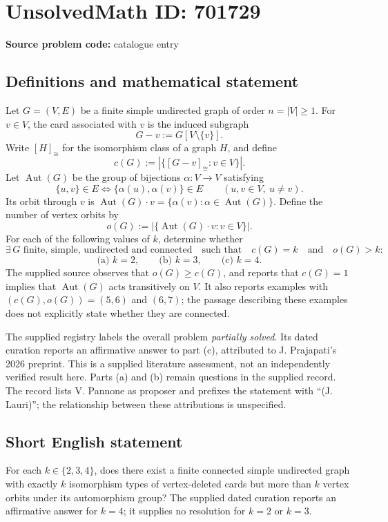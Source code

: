 \documentclass[11pt]{article}
\begin{document}
\section*{UnsolvedMath ID: 701729}
\textbf{Source problem code:} catalogue entry
\subsection{Definitions and mathematical statement}
Let \(G=(V,E)\) be a finite simple undirected graph of order \(n=|V|\geq 1\). For \(v\in V\), the card associated with \(v\) is the induced subgraph
\[
G-v:=G[V\setminus\{v\}].
\]
Write \([H]_{\cong}\) for the isomorphism class of a graph \(H\), and define
\[
c(G):=\left|\{[G-v]_{\cong}:v\in V\}\right|.
\]
Let \(\operatorname{Aut}(G)\) be the group of bijections \(\alpha:V\to V\) satisfying
\[
\{u,v\}\in E\iff\{\alpha(u),\alpha(v)\}\in E
\qquad(u,v\in V,
\ u\ne v).
\]
Its orbit through \(v\) is \(\operatorname{Aut}(G)\cdot v=\{\alpha(v):\alpha\in\operatorname{Aut}(G)\}\). Define the number of vertex orbits by
\[
o(G):=\left|\{\operatorname{Aut}(G)\cdot v:v\in V\}\right|.
\]
For each of the following values of \(k\), determine whether
\[
\exists\,G\text{ finite, simple, undirected and connected}
\quad\text{such that}\quad c(G)=k\quad\text{and}\quad o(G)>k:
\]
\[
\text{(a) }k=2,\qquad \text{(b) }k=3,\qquad \text{(c) }k=4.
\]
The supplied source observes that \(o(G)\geq c(G)\), and reports that \(c(G)=1\) implies that \(\operatorname{Aut}(G)\) acts transitively on \(V\). It also reports examples with \((c(G),o(G))=(5,6)\) and \((6,7)\); the passage describing these examples does not explicitly state whether they are connected.

The supplied registry labels the overall problem \emph{partially solved}. Its dated curation reports an affirmative answer to part (c), attributed to J. Prajapati's 2026 preprint. This is a supplied literature assessment, not an independently verified result here. Parts (a) and (b) remain questions in the supplied record. The record lists V. Pannone as proposer and prefixes the statement with ``(J. Lauri)''; the relationship between these attributions is unspecified.
\subsection{Short English statement}
For each \(k\in\{2,3,4\}\), does there exist a finite connected simple undirected graph with exactly \(k\) isomorphism types of vertex-deleted cards but more than \(k\) vertex orbits under its automorphism group? The supplied dated curation reports an affirmative answer for \(k=4\); it supplies no resolution for \(k=2\) or \(k=3\).
\end{document}

